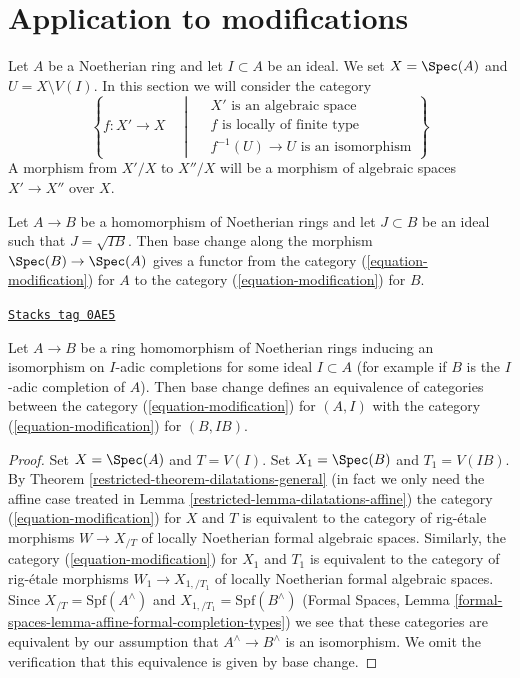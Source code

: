 \section{Application to modifications}
\label{restricted-section-modifications}
Let $A$ be a Noetherian ring and let $I \subset A$ be an ideal. We set
$X = \Spec(A)$ and $U = X \setminus V(I)$. In this section
we will consider the category
\begin{equation}
\label{equation-modification}
\left\{
f : X' \longrightarrow X
\quad \middle| \quad
\begin{matrix}
X'\text{ is an algebraic space}\\
f\text{ is locally of finite type}\\
f^{-1}(U) \to U\text{ is an isomorphism}
\end{matrix}
\right\}
\end{equation}
A morphism from $X'/X$ to $X''/X$ will be a morphism of algebraic spaces
$X' \to X''$ over $X$.

\medskip\noindent
Let $A \to B$ be a homomorphism of Noetherian rings and let $J \subset B$
be an ideal such that $J = \sqrt{I B}$. Then base
change along the morphism $\Spec(B) \to \Spec(A)$ gives a functor
from the category (\ref{equation-modification}) for $A$
to the category (\ref{equation-modification}) for $B$.

\begin{lemma}
\label{restricted-lemma-Noetherian-local-ring}
\href{https://stacks.math.columbia.edu/tag/0AE5}{\texttt{Stacks tag 0AE5}}

Let $A \to B$ be a ring homomorphism of Noetherian rings inducing an
isomorphism on $I$-adic completions for some ideal $I \subset A$
(for example if $B$ is the $I$-adic completion of $A$).
Then base change defines an equivalence of categories between the
category (\ref{equation-modification}) for $(A, I)$
with the category (\ref{equation-modification}) for $(B, IB)$.
\end{lemma}

\begin{proof}

Set $X = \Spec(A)$ and $T = V(I)$.
Set $X_1 = \Spec(B)$ and $T_1 = V(IB)$.
By Theorem \ref{restricted-theorem-dilatations-general} (in fact we only need
the affine case treated in Lemma \ref{restricted-lemma-dilatations-affine})
the category (\ref{equation-modification}) for $X$ and $T$
is equivalent to the category of rig-\'etale morphisms
$W \to X_{/T}$ of locally Noetherian formal algebraic spaces.
Similarly, the category (\ref{equation-modification})
for $X_1$ and $T_1$ is equivalent to the category of rig-\'etale
morphisms $W_1 \to X_{1, /T_1}$ of locally Noetherian formal
algebraic spaces. Since $X_{/T} = \text{Spf}(A^\wedge)$
and $X_{1, /T_1} = \text{Spf}(B^\wedge)$ (Formal Spaces, Lemma
\ref{formal-spaces-lemma-affine-formal-completion-types}) we see that
these categories are equivalent by our assumption that
$A^\wedge \to B^\wedge$ is an isomorphism. We omit the verification
that this equivalence is given by base change.
\end{proof}

